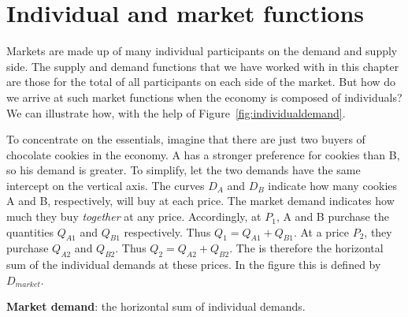 \newpage
\section{Individual and market functions}\label{sec:ch3sec8}

Markets are made up of many individual participants on the demand and supply
side. The supply and demand functions that we have worked with in this
chapter are those for the total of all participants on each side of the
market. But how do we arrive at such market functions when the economy is
composed of individuals? We can illustrate how, with the help of
Figure~\ref{fig:individualdemand}.




\newhtmlpage

To concentrate on the essentials, imagine that there are just two buyers of
chocolate cookies in the economy. A has a stronger preference for cookies than B, so his demand is
greater. To simplify, let the two demands have the same intercept on the
vertical axis. The curves $D_A$ and $D_B$ indicate how many cookies A and
B, respectively, will buy at each price. The market demand indicates how
much they buy \textit{together} at any price. Accordingly, at $P_1$, A and B
purchase the quantities $Q_{A1}$ and $Q_{B1}$ respectively. Thus $Q_1=Q_{A1}+Q_{B1}$.
At a price $P_2$, they purchase $Q_{A2}$ and $Q_{B2}$. Thus $Q_2=Q_{A2}+Q_{B2}$.
The  is therefore the horizontal sum of the individual
demands at these prices. In the figure this is defined by $D_{market}$.

\begin{DefBox}
\textbf{Market demand}: the horizontal sum of individual demands.
\end{DefBox}
